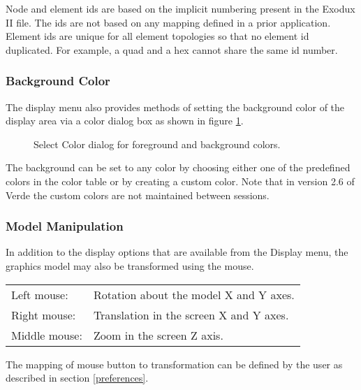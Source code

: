 \documentclass[10pt]{report}
\begin{document}
Node and element ids are based on the implicit numbering present
in the Exodux II file.  The ids are not based on any mapping defined
in a prior application.  Element ids are unique for all element topologies
so that no element id duplicated.  For example, a quad and a hex cannot
share the same id number.

\subsubsection{Background Color}
\label{colors}

The display menu also provides methods of setting the  
background color of the display area via a color dialog box as shown in figure
\ref{fig:color_dlg}.

\htmlrule
\begin{figure}[tbh]
  \begin{center}
              {}
    \caption{Select Color dialog for foreground and background colors.}
    \label{fig:color_dlg}
  \end{center}
\end{figure}     
\htmlrule

The background can be set to any color by choosing 
either one of the predefined colors in the color table or by creating a 
custom color.  Note that in version 2.6 of Verde the custom colors are 
not maintained between sessions.


\subsubsection{Model Manipulation}
\label{manipulation}

In addition to the display options that are available from the Display 
menu, the graphics model may also be transformed using the mouse.  


\begin{center}
\begin{tabular}{ll}
Left mouse:   & Rotation about the model X and Y axes.  \\
Right mouse:  & Translation in the screen X and Y axes. \\
Middle mouse: & Zoom in the screen Z axis.              \\
\end{tabular}
\end{center}


The mapping of mouse button to transformation can be defined 
by the user as described in section \ref{preferences}.
\end{document}
